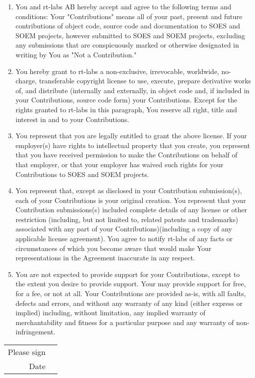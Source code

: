\documentclass[10pt,a4paper]{article}
\begin{document}
\begin{enumerate}
\item You and rt-labs AB hereby accept and agree to the following terms and conditions:
Your "Contributions" means all of your past, present and future contributions of object code, source code and documentation to SOES and SOEM projects, however submitted to SOES and SOEM projects, excluding any submissions that are conspicuously marked or otherwise designated in writing by You as "Not a Contribution."
\item You hereby grant to rt-labs a non-exclusive, irrevocable, worldwide, no-charge, transferable copyright license to use, execute, prepare derivative works of, and distribute (internally and externally, in object code and, if included in your Contributions, source code form) your Contributions. Except for the rights granted to rt-labs in this paragraph, You reserve all right, title and interest in and to your Contributions.
\item You represent that you are legally entitled to grant the above license. If your employer(s) have rights to intellectual property that you create, you represent that you have received permission to make the Contributions on behalf of that employer, or that your employer has waived such rights for your Contributions to SOES and SOEM projects.
\item You represent that, except as disclosed in your Contribution submission(s), each of your Contributions is your original creation. You represent that your Contribution submissions(s) included complete details of any license or other restriction (including, but not limited to, related patents and trademarks) associated with any part of your Contributions)(including a copy of any applicable license agreement). You agree to notify rt-labs of any facts or circumstances of which you become aware that would make Your representations in the Agreement inaccurate in any respect.
\item You are not expected to provide support for your Contributions, except to the extent you desire to provide support. Your may provide support for free, for a fee, or not at all. Your Contributions are provided as-is, with all faults, defects and errors, and without any warranty of any kind (either express or implied) including, without limitation, any implied warranty of merchantability and fitness for a particular purpose and any warranty of non-infringement.
\end{enumerate}

\medskip
\begin{tabularx}{\textwidth}{rX}
Please sign & \hrulefill \\
Date & \hrulefill \\
\end{tabularx}
\end{document}
